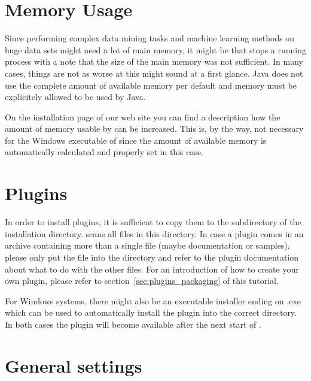 \section{Memory Usage}
\label{sec:memory_usage}

Since performing complex data mining tasks and machine learning methods on 
huge data sets might need a lot of main memory, it might be that \rapidminer stops
a running process with a note that the size of the main memory was not 
sufficient. In many cases, things are not as worse at this might sound at
a first glance. Java does not use the complete amount of available memory 
per default and memory must be explicitely allowed to be used by Java.

On the installation page of our web site \rapidminerurl{} you can find a description 
how the amount of memory usable by \rapidminer can be increased. This is, by the way, 
not necessary for the Windows executable of \rapidminer since the amount of available 
memory is automatically calculated and properly set in this case.



\section{Plugins}
\label{sec:plugins_installing}

In order to install \rapidminer plugins, it is sufficient to copy them to the
 subdirectory of the \rapidminer installation
directory. \rapidminer scans all  files in this directory. In
case a plugin comes in an archive containing more than a single 
 file (maybe documentation or samples), please only
put the  file into the  directory and
refer to the plugin documentation about what to do with the other
files. For an introduction of how to create your own plugin, please
refer to section~\ref{sec:plugins_packaging} of this tutorial.

For Windows systems, there might also be an executable installer ending on
.exe which can be used to automatically install the plugin into the correct
directory. In both cases the plugin will become available after the next start
of \rapidminer.


 

\section{General settings}
\label{sec:globalsettings}

